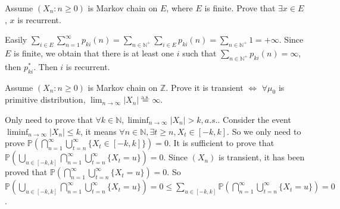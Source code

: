 \documentclass{ctexart}
\begin{document}
\begin{problem}\label{pro:3}
  Assume \((X_n: n \geq 0)\) is Markov chain on \(E\), where \(E\) is finite. Prove that \(\exists x \in E\), \(x\) is recurrent.
\end{problem}
\begin{solution}
  Easily \(\sum_{i \in E}\sum_{n=1}^{\infty} p_{ki}(n)=\sum_{n \in \mathbb{N}^+}\sum_{i \in E}p_{ki}(n)=\sum_{n \in \mathbb{N}^+} 1=+\infty\).
  Since \(E\) is finite, we obtain that there is at least one \(i\) such that \(\sum_{n \in \mathbb{N}^+}p_{ki}(n)=\infty\), then \(p_{ki}^{*}\).
  Then \(i\) is recurrent.
\end{solution}

\begin{problem}\label{pro:4}
  Assume \((X_n:n \geq 0)\) is Markov chain on \(\mathbb{Z}\). Prove it is transient \(\iff\)
  \(\forall \mu_0\) is primitive distribution, \(\lim_{n \to \infty} |X_n| \overset{\text{a.s.}}{=} \infty\).
\end{problem}
\begin{solution}
  Only need to prove that \(\forall k \in \mathbb{N},\liminf_{n \to \infty}|X_n|>k,a. s.\).
  Consider the event \(\liminf_{n \to \infty}|X_n|\leq k\), it means \(\forall n \in \mathbb{N},\exists t \geq n,X_t \in [-k,k]\).
  So we only need to prove \(\mathbb{P}\left(\bigcap_{n=1}^{\infty} \bigcup_{t=n}^{\infty} \{X_t \in [-k,k]\}\right)=0\).
  It is sufficient to prove that \(\mathbb{P}(\bigcup_{u \in [-k,k]}\bigcap_{n=1}^{\infty} \bigcup_{t=n}^{\infty} \{X_t=u\})=0\).
  Since \((X_n)\) is transient, it has been proved that \(\mathbb{P}(\bigcap_{n=1}^{\infty} \bigcup_{t=n}^{\infty} \{X_t=u\})=0\).
  So \(\mathbb{P}(\bigcup_{u \in [-k,k]}\bigcap_{n=1}^{\infty} \bigcup_{t=n}^{\infty} \{X_t=u\})=0 \leq \sum_{u \in [-k,k]}\mathbb{P}(\bigcap_{n=1}^{\infty} \bigcup_{t=n}^{\infty} \{X_t=u\})=0\).
\end{solution}
\end{document}
